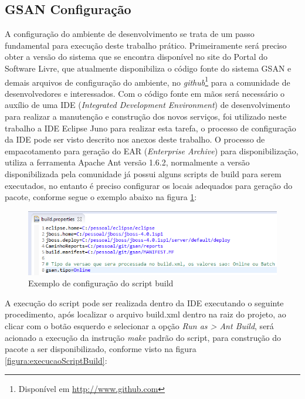 \subsection{GSAN Configuração}
A configuração do ambiente de desenvolvimento se trata de um passo fundamental para execução deste trabalho prático. Primeiramente será preciso obter a versão do sistema que se encontra disponível no site do Portal do Software Livre, que atualmente disponibiliza o código fonte do sistema GSAN e demais arquivos de configuração do ambiente, no \textit{github}\footnote{Disponível em \url{http://www.github.com}} para a comunidade de desenvolvedores e interessados.  Com o código fonte em mãos será necessário o auxílio de uma IDE (\textit{Integrated Development Environment}) de desenvolvimento para realizar a manutenção e construção dos novos serviços, foi utilizado neste trabalho a IDE Eclipse Juno para realizar esta tarefa, o processo de configuração da IDE pode ser visto descrito nos anexos deste trabalho.
O processo de empacotamento para geração do EAR (\textit{Enterprise Archive}) para disponibilização, utiliza a ferramenta Apache Ant versão 1.6.2, normalmente a versão disponibilizada pela comunidade já possui alguns scripts de build para serem executados, no entanto é preciso configurar os locais adequados para geração do pacote, conforme segue o exemplo abaixo na figura \ref{figura:configuracaoScriptBuild}:


\begin{figure}[H]
	\centering
	\caption{Exemplo de configuração do script build}
	\label{figura:configuracaoScriptBuild}	
	\includegraphics{figuras/build_properties.png}
\end{figure}
	
A execução do script pode ser realizada dentro da IDE executando o seguinte procedimento, após localizar o arquivo build.xml dentro na raiz do projeto, ao clicar com o botão esquerdo e selecionar a opção \textit{Run as > Ant Build}, será acionado a execução da instrução \textit{make} padrão do script, para construção do pacote a ser disponibilizado, conforme visto na figura \ref{figura:execucaoScriptBuild}:	
		
